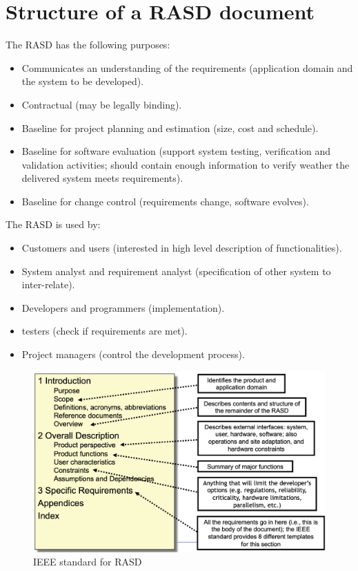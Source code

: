 \documentclass[12pt, a4paper]{report}
\newtheorem[style=M,bodystyle=\normalfont]{theorem}{Theorem}
\newtheorem[style=M,bodystyle=\normalfont]{corollary}{Corollary}
\newtheorem[style=M,bodystyle=\normalfont]{lemma}{Lemma}
\newtheorem[style=M,bodystyle=\normalfont]{definition}{Definition}
\begin{document}
\section{Structure of a RASD document}
    The RASD has the following purposes: 
    \begin{itemize}
        \item Communicates an understanding of the requirements (application domain and the system to be developed).
        \item Contractual (may be legally binding).
        \item Baseline for project planning and estimation (size, cost and schedule).
        \item Baseline for software evaluation (support system testing, verification and validation activities; should contain enough information to verify weather the delivered system meets requirements).
        \item Baseline for change control (requirements change, software evolves).
    \end{itemize}
    The RASD is used by:
    \begin{itemize}
        \item Customers and users (interested in high level description of functionalities).
        \item System analyst and requirement analyst (specification of other system to inter-relate).
        \item Developers and programmers (implementation).
        \item testers (check if requirements are met).
        \item Project managers (control the development process).
    \end{itemize}
    \begin{figure}
        \centering
        \includegraphics[width=1\linewidth]{images/RASD.png}
        \caption{IEEE standard for RASD}
    \end{figure}
\end{document}
